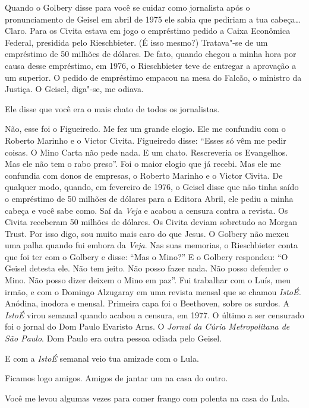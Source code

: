 \falaG Quando o Golbery disse para você se cuidar como jornalista após o
pronunciamento de Geisel em abril de 1975 ele sabia que pediriam a tua
cabeça… \falaM Claro. Para os Civita estava em jogo o empréstimo pedido a
Caixa Econômica Federal, presidida pelo Rieschbieter. (É isso mesmo?)
Tratava"-se de um empréstimo de 50 milhões de dólares. De fato, quando
chegou a minha hora por causa desse empréstimo, em 1976, o Rieschbieter
teve de entregar a aprovação a um superior. O pedido de empréstimo
empacou na mesa do Falcão, o ministro da Justiça. O Geisel, diga"-se, me
odiava.

\falaG Ele disse que você era o mais chato de todos os jornalistas.

\falaM Não, esse foi o Figueiredo. Me fez um grande elogio. Ele me confundiu
com o Roberto Marinho e o Victor Civita. Figueiredo disse: ``Esses só
vêm me pedir coisas. O Mino Carta não pede nada. E um chato. Rescreveria
os Evangelhos. Mas ele não tem o rabo preso''. Foi o maior elogio que já
recebi. Mas ele me confundia com donos de empresas, o Roberto Marinho e
o Victor Civita. De qualquer modo, quando, em fevereiro de 1976, o
Geisel disse que não tinha saído o empréstimo de 50 milhões de dólares
para a Editora Abril, ele pediu a minha cabeça e você sabe como. Saí da
\emph{Veja} e acabou a censura contra a revista. Os Civita receberam 50
milhões de dólares. Os Civita deviam sobretudo ao Morgan Trust. Por isso
digo, sou muito mais caro do que Jesus. O Golbery não mexeu uma palha
quando fui embora da \emph{Veja}. Nas suas memorias, o Rieschbieter
conta que foi ter com o Golbery e disse: ``Mas o Mino?'' E o Golbery
respondeu: ``O Geisel detesta ele. Não tem jeito. Não posso fazer nada.
Não posso defender o Mino. Não posso dizer deixem o Mino em paz''. Fui
trabalhar com o Luís, meu irmão, e com o Domingo Alzugaray em uma
revista mensal que se chamou \emph{IstoÉ.} Anódina, inodora e mensal.
Primeira capa foi o Beethoven, sobre os surdos. A \emph{IstoÉ} virou
semanal quando acabou a censura, em 1977. O último a ser censurado foi o
jornal do Dom Paulo Evaristo Arns. O \emph{Jornal da Cúria Metropolitana
de São Paulo}. Dom Paulo era outra pessoa odiada pelo Geisel.

\falaG E com a \emph{IstoÉ} semanal veio tua amizade com o Lula.

\falaM Ficamos logo amigos. Amigos de jantar um na casa do outro.

\falaG Você me levou algumas vezes para comer frango com polenta na casa do
Lula.

